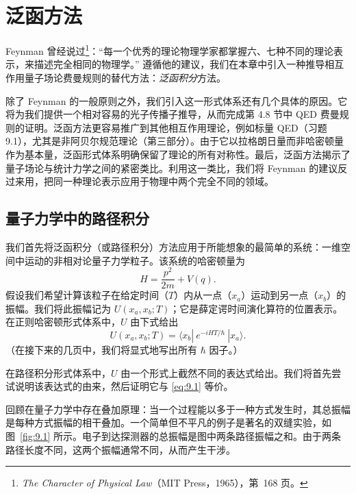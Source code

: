 \chapter{泛函方法}

Feynman 曾经说过\footnote{\emph{The Character of Physical Law}（MIT Press，1965），第~168 页。}：``每一个优秀的理论物理学家都掌握六、七种不同的理论表示，来描述完全相同的物理学。'' 遵循他的建议，我们在本章中引入一种推导相互作用量子场论费曼规则的替代方法：\emph{泛函积分}方法。

除了 Feynman 的一般原则之外，我们引入这一形式体系还有几个具体的原因。它将为我们提供一个相对容易的光子传播子推导，从而完成第 4.8 节中 QED 费曼规则的证明。泛函方法更容易推广到其他相互作用理论，例如标量 QED（习题 9.1），尤其是非阿贝尔规范理论（第三部分）。由于它以拉格朗日量而非哈密顿量作为基本量，泛函形式体系明确保留了理论的所有对称性。最后，泛函方法揭示了量子场论与统计力学之间的紧密类比。利用这一类比，我们将 Feynman 的建议反过来用，把同一种理论表示应用于物理中两个完全不同的领域。

\section{量子力学中的路径积分}

我们首先将泛函积分（或路径积分）方法应用于所能想象的最简单的系统：一维空间中运动的非相对论量子力学粒子。该系统的哈密顿量为
\begin{equation}
  H = \frac{p^2}{2m} + V(q) .
\end{equation}
假设我们希望计算该粒子在给定时间（$T$）内从一点（$x_a$）运动到另一点（$x_b$）的振幅。我们将此振幅记为 $U(x_a, x_b; T)$；它是薛定谔时间演化算符的位置表示。在正则哈密顿形式体系中，$U$ 由下式给出
\begin{equation}
  U(x_a, x_b; T) = \langle x_b|\ e^{-iHT/\hbar}\ |x_a\rangle .
  \label{eq:9.1}
\end{equation}
（在接下来的几页中，我们将显式地写出所有 $\hbar$ 因子。）

在路径积分形式体系中，$U$ 由一个形式上截然不同的表达式给出。我们将首先尝试说明该表达式的由来，然后证明它与 \eqref{eq:9.1} 等价。

回顾在量子力学中存在叠加原理：当一个过程能以多于一种方式发生时，其总振幅是每种方式振幅的相干叠加。一个简单但不平凡的例子是著名的双缝实验，如图~\ref{fig:9.1} 所示。电子到达探测器的总振幅是图中两条路径振幅之和。由于两条路径长度不同，这两个振幅通常不同，从而产生干涉。

